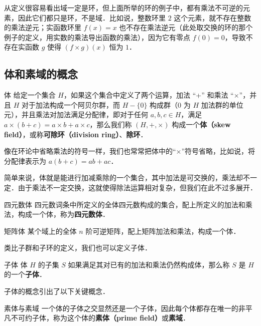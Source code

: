 从定义很容易看出域一定是环，但上面所举的环的例子中，都有乘法不可逆的元素，因此它们都只是环，不是域．比如说，整数环里 $2$ 这个元素，就不存在整数的乘法逆元；实函数环里 $f(x)=x$ 也不存在乘法逆元（此处取交换的环的那个例子的定义，用实数的乘法导出函数的乘法），因为它有零点 $f(0)=0$，导致不存在实函数 $g$ 使得 $(f\times g)(x)$ 恒为 $1$．




\subsection{体和素域的概念}

\begin{definition}{体}\label{field_def1}
给定一个集合 $H$，如果这个集合中定义了两个运算，加法 “+” 和乘法 “$\times$”，并且 $H$ 对于加法构成一个阿贝尔群，而 $H-\{0\}$ 构成群（$0$ 为 $H$ 加法群的单位元），并且乘法对加法满足分配律，即对于任何 $a, b, c\in H$，满足 $a\times(b+c)=a\times b+a\times c$，那么我们称 $(H, +, \times)$ 构成一个\textbf{体（skew field）}，或称\textbf{可除环（division ring）}、\textbf{除环}．
\end{definition}

像在环论中省略乘法的符号一样，我们也常常把体中的“$\times$”符号省略，比如说，将分配律表示为 $a(b+c)=ab+ac$．

简单来说，体就是能进行加减乘除的一个集合，其中加法是可交换的，乘法却不一定．由于乘法不一定交换，这就使得除法运算相对复杂，但我们在此不过多展开．

\begin{example}{四元数体}
四元数词条中所定义的全体四元数构成的集合，配上所定义的加法和乘法，构成一个体，称为\textbf{四元数体}．
\end{example}

\begin{example}{矩阵体}
某个域上的全体 $n$ 阶可逆矩阵，配上矩阵加法和乘法，构成一个体．
\end{example}

类比子群和子环的定义，我们也可以定义子体．

\begin{definition}{子体}
体 $H$ 的子集 $S$ 如果满足其对已有的加法和乘法仍然构成体，那么称 $S$ 是 $H$ 的一个\textbf{子体}．
\end{definition}
子体的概念引出了以下关键概念．
\begin{definition}{素体与素域}
一个体的子体之交显然还是一个子体，因此每个体都存在唯一的非平凡不可约子体，称为这个体的\textbf{素体（prime field）}或\textbf{素域}．
\end{definition}

